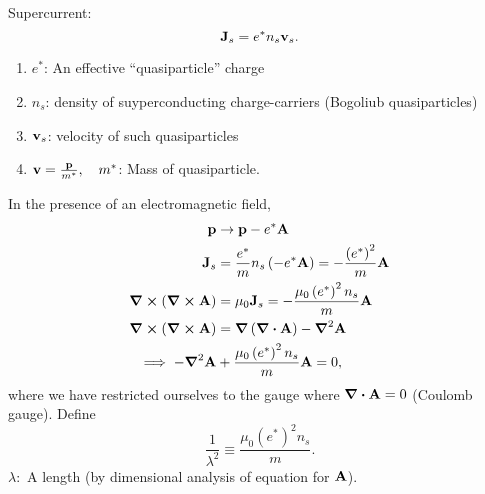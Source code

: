 Supercurrent:
\begin{equation} 
\vb J_s = e^*n_s\vb v_s.
\end{equation}
\begin{enumerate}[]
	\item $e^*$: An effective ``quasiparticle'' charge
	\item $n_s$: density of suyperconducting charge-carriers (Bogoliub quasiparticles)
	\item $\vb v_s$: velocity of such quasiparticles
	\item $\vb v = \frac{\vb p}{m^*},\quad m^*$: Mass of quasiparticle.
\end{enumerate}
In the presence of an electromagnetic field,
\begin{align} 
\vb p &\rightarrow \vb p - e^*\vb A\\
\vb J_s &= \frac{e^*}{m}n_s\left( -e^*\vb A \right) = -\frac{\left(e^*\right)^2}{m}\vb A \\
\curl{(\curl{\vb A})} &= \mu_0\vb J_s = -\frac{\mu_0\left( e^* \right)^2n_s}{m}\vb A\\
\curl{\left( \curl{\vb A \right)}} &= \grad{\left( \div{\vb A} \right)} -\grad^2\vb A \\
\implies -\grad^2\vb A &+  \frac{\mu_0\left( e^* \right)^2n_s}{m}\vb A = 0,
\end{align}
where we have restricted ourselves to the gauge where $\div{\vb A} = 0$ (Coulomb gauge).
Define 
\begin{equation} 
\frac{1}{\lambda^2} \equiv \frac{\mu_0\left( e^* \right)^2n_s}{m}.
\end{equation}
$\lambda:$ A length (by dimensional analysis of equation for $\vb A$).

